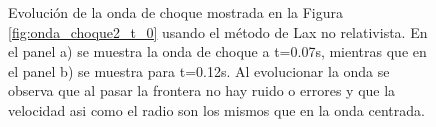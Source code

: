 \documentclass[12pt,a4paper]{book}
\begin{document}
\begin{figure}[H]
\centering
{}
\caption{\label{fig:Lax-prueba2_no_centrado}Evolución de la onda de choque mostrada en la Figura \ref{fig:onda_choque2_t_0} usando el método de Lax no relativista. En el panel a) se muestra la onda de choque a t=0.07s, mientras que en el panel b) se muestra para t=0.12s. Al evolucionar la onda se observa que al pasar la frontera no hay ruido o errores y que la velocidad asi como el radio son los mismos que en la onda centrada.} 
\end{figure}
\end{document}

